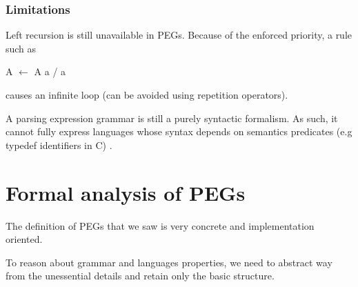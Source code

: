\begin{frame}
	\frametitle{Limitations}
	\begin{block}{}
		Left recursion is still unavailable in PEGs. Because of the enforced priority,  a rule such as 
		\begin{center}A $\leftarrow$ A a / a\end{center}
		causes an infinite loop (can be avoided using repetition operators).
		
	\end{block}
	\begin{block}{}
		A parsing expression grammar is still a purely syntactic formalism. As such, it cannot fully express languages whose syntax depends on semantics predicates (e.g typedef identifiers in C) .  
	\end{block}
\end{frame}

\section{Formal analysis of PEGs}

\begin{frame}
	\begin{block}{}The definition of PEGs that we saw is very concrete and implementation oriented.\end{block}
	
	\begin{block}{}To reason about grammar and languages properties, we need to abstract way from the  unessential details and retain only the basic structure.\end{block}
\end{frame}

